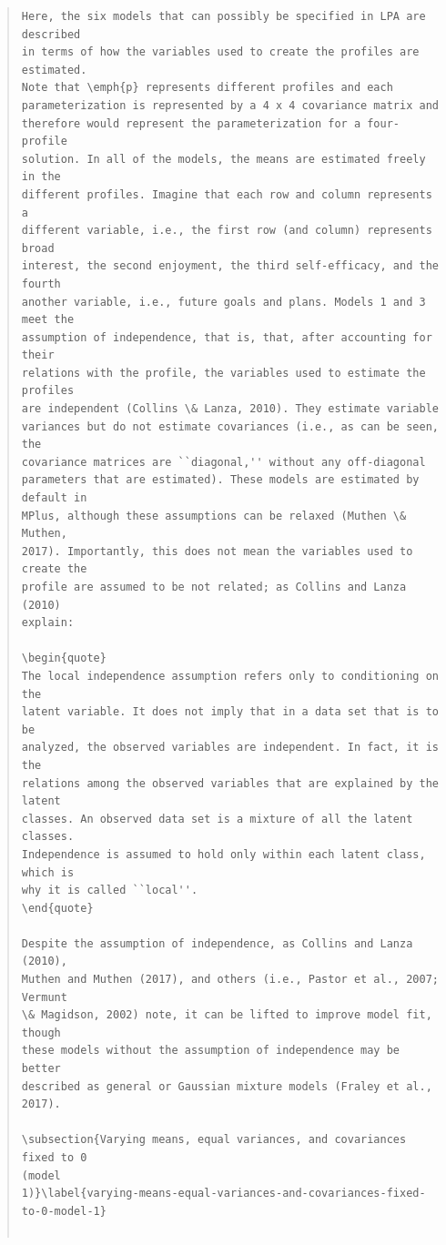 \documentclass[]{msu-thesis}
\theoremstyle{definition}
\theoremstyle{definition}
\theoremstyle{definition}
\theoremstyle{remark}
\begin{document}
\begin{quote}
\begin{lstlisting}
Here, the six models that can possibly be specified in LPA are described
in terms of how the variables used to create the profiles are estimated.
Note that \emph{p} represents different profiles and each
parameterization is represented by a 4 x 4 covariance matrix and
therefore would represent the parameterization for a four-profile
solution. In all of the models, the means are estimated freely in the
different profiles. Imagine that each row and column represents a
different variable, i.e., the first row (and column) represents broad
interest, the second enjoyment, the third self-efficacy, and the fourth
another variable, i.e., future goals and plans. Models 1 and 3 meet the
assumption of independence, that is, that, after accounting for their
relations with the profile, the variables used to estimate the profiles
are independent (Collins \& Lanza, 2010). They estimate variable
variances but do not estimate covariances (i.e., as can be seen, the
covariance matrices are ``diagonal,'' without any off-diagonal
parameters that are estimated). These models are estimated by default in
MPlus, although these assumptions can be relaxed (Muthen \& Muthen,
2017). Importantly, this does not mean the variables used to create the
profile are assumed to be not related; as Collins and Lanza (2010)
explain:

\begin{quote}
The local independence assumption refers only to conditioning on the
latent variable. It does not imply that in a data set that is to be
analyzed, the observed variables are independent. In fact, it is the
relations among the observed variables that are explained by the latent
classes. An observed data set is a mixture of all the latent classes.
Independence is assumed to hold only within each latent class, which is
why it is called ``local''.
\end{quote}

Despite the assumption of independence, as Collins and Lanza (2010),
Muthen and Muthen (2017), and others (i.e., Pastor et al., 2007; Vermunt
\& Magidson, 2002) note, it can be lifted to improve model fit, though
these models without the assumption of independence may be better
described as general or Gaussian mixture models (Fraley et al., 2017).

\subsection{Varying means, equal variances, and covariances fixed to 0
(model
1)}\label{varying-means-equal-variances-and-covariances-fixed-to-0-model-1}


\end{lstlisting}
\end{quote}
\end{document}

